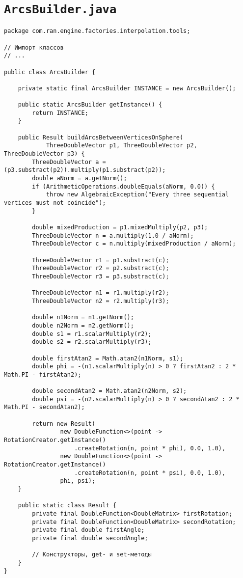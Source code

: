 \section*{\texttt{ArcsBuilder.java}}
\begin{verbatim}
package com.ran.engine.factories.interpolation.tools;

// Импорт классов
// ...

public class ArcsBuilder {

    private static final ArcsBuilder INSTANCE = new ArcsBuilder();

    public static ArcsBuilder getInstance() {
        return INSTANCE;
    }

    public Result buildArcsBetweenVerticesOnSphere(
            ThreeDoubleVector p1, ThreeDoubleVector p2, ThreeDoubleVector p3) {
        ThreeDoubleVector a = (p3.substract(p2)).multiply(p1.substract(p2));
        double aNorm = a.getNorm();
        if (ArithmeticOperations.doubleEquals(aNorm, 0.0)) {
            throw new AlgebraicException("Every three sequential vertices must not coincide");
        }

        double mixedProduction = p1.mixedMultiply(p2, p3);
        ThreeDoubleVector n = a.multiply(1.0 / aNorm);
        ThreeDoubleVector c = n.multiply(mixedProduction / aNorm);

        ThreeDoubleVector r1 = p1.substract(c);
        ThreeDoubleVector r2 = p2.substract(c);
        ThreeDoubleVector r3 = p3.substract(c);

        ThreeDoubleVector n1 = r1.multiply(r2);
        ThreeDoubleVector n2 = r2.multiply(r3);

        double n1Norm = n1.getNorm();
        double n2Norm = n2.getNorm();
        double s1 = r1.scalarMultiply(r2);
        double s2 = r2.scalarMultiply(r3);

        double firstAtan2 = Math.atan2(n1Norm, s1);
        double phi = -(n1.scalarMultiply(n) > 0 ? firstAtan2 : 2 * Math.PI - firstAtan2);

        double secondAtan2 = Math.atan2(n2Norm, s2);
        double psi = -(n2.scalarMultiply(n) > 0 ? secondAtan2 : 2 * Math.PI - secondAtan2);

        return new Result(
                new DoubleFunction<>(point -> RotationCreator.getInstance()
                    .createRotation(n, point * phi), 0.0, 1.0),
                new DoubleFunction<>(point -> RotationCreator.getInstance()
                    .createRotation(n, point * psi), 0.0, 1.0),
                phi, psi);
    }

    public static class Result {
        private final DoubleFunction<DoubleMatrix> firstRotation;
        private final DoubleFunction<DoubleMatrix> secondRotation;
        private final double firstAngle;
        private final double secondAngle;

        // Конструкторы, get- и set-методы
    }
}
\end{verbatim}

